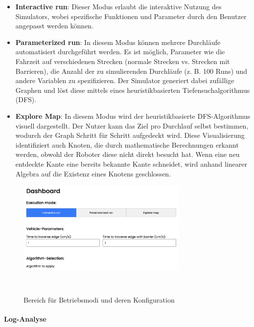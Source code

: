 \documentclass[main.tex]{subfiles} %
\begin{document}
\begin{itemize}
    \item \textbf{Interactive run}:
    Dieser Modus erlaubt die interaktive Nutzung des Simulators, wobei spezifische Funktionen und Parameter durch den Benutzer angepasst werden können.

    \item \textbf{Parameterized run}:  
    In diesem Modus können mehrere Durchläufe automatisiert durchgeführt werden. Es ist möglich, Parameter wie die Fahrzeit auf verschiedenen Strecken (normale Strecken vs. Strecken mit Barrieren), die Anzahl der zu simulierenden Durchläufe (z. B. 100 Runs) und andere Variablen zu spezifizieren. Der Simulator generiert dabei zufällige Graphen und löst diese mittels eines heuristikbasierten Tiefensuchalgorithmus (DFS).

    \item \textbf{Explore Map}:  
    In diesem Modus wird der heuristikbasierte DFS-Algorithmus visuell dargestellt. Der Nutzer kann das Ziel pro Durchlauf selbst bestimmen, wodurch der Graph Schritt für Schritt aufgedeckt wird. Diese Visualisierung identifiziert auch Knoten, die durch mathematische Berechnungen erkannt werden, obwohl der Roboter diese nicht direkt besucht hat. Wenn eine neu entdeckte Kante eine bereits bekannte Kante schneidet, wird anhand linearer Algebra auf die Existenz eines Knotens geschlossen.
\end{itemize}

\begin{figure}[H]
    \centering
    \includegraphics[width=0.75\textwidth]{./fig_Simulation/SimulatorConfig.png}
    \caption{Bereich für Betriebsmodi und deren Konfiguration}~\label{fig:DashboardConfig}
\end{figure}

\paragraph{Log-Analyse}
\end{document}
